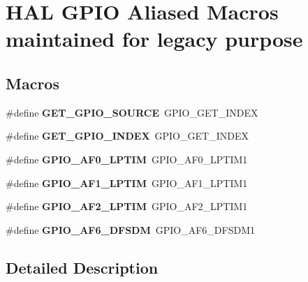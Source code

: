 \hypertarget{group___h_a_l___g_p_i_o___aliased___macros}{}\section{H\+AL G\+P\+IO Aliased Macros maintained for legacy purpose}
\label{group___h_a_l___g_p_i_o___aliased___macros}
\subsection*{Macros}
\begin{DoxyCompactItemize}
\item 
\mbox{\label{group___h_a_l___g_p_i_o___aliased___macros_ga519fafd507db0341f56b24e6f5509561}} 
\#define {\bfseries G\+E\+T\+\_\+\+G\+P\+I\+O\+\_\+\+S\+O\+U\+R\+CE}~G\+P\+I\+O\+\_\+\+G\+E\+T\+\_\+\+I\+N\+D\+EX
\item 
\mbox{\label{group___h_a_l___g_p_i_o___aliased___macros_ga1c140fcfc79bb7185eed044b05792d70}} 
\#define {\bfseries G\+E\+T\+\_\+\+G\+P\+I\+O\+\_\+\+I\+N\+D\+EX}~G\+P\+I\+O\+\_\+\+G\+E\+T\+\_\+\+I\+N\+D\+EX
\item 
\mbox{\label{group___h_a_l___g_p_i_o___aliased___macros_gab7abf9473a43a0b3d2c494d9946ef5ab}} 
\#define {\bfseries G\+P\+I\+O\+\_\+\+A\+F0\+\_\+\+L\+P\+T\+IM}~G\+P\+I\+O\+\_\+\+A\+F0\+\_\+\+L\+P\+T\+I\+M1
\item 
\mbox{\label{group___h_a_l___g_p_i_o___aliased___macros_ga4dd6c2f7aa06ea43dd9e6fe568c34e60}} 
\#define {\bfseries G\+P\+I\+O\+\_\+\+A\+F1\+\_\+\+L\+P\+T\+IM}~G\+P\+I\+O\+\_\+\+A\+F1\+\_\+\+L\+P\+T\+I\+M1
\item 
\mbox{\label{group___h_a_l___g_p_i_o___aliased___macros_ga93742854899db59892aa438ce7c8a2d6}} 
\#define {\bfseries G\+P\+I\+O\+\_\+\+A\+F2\+\_\+\+L\+P\+T\+IM}~G\+P\+I\+O\+\_\+\+A\+F2\+\_\+\+L\+P\+T\+I\+M1
\item 
\mbox{\label{group___h_a_l___g_p_i_o___aliased___macros_ga9c9e931dff3a4678b468c65b16f6f87e}} 
\#define {\bfseries G\+P\+I\+O\+\_\+\+A\+F6\+\_\+\+D\+F\+S\+DM}~G\+P\+I\+O\+\_\+\+A\+F6\+\_\+\+D\+F\+S\+D\+M1
\end{DoxyCompactItemize}


\subsection{Detailed Description}
